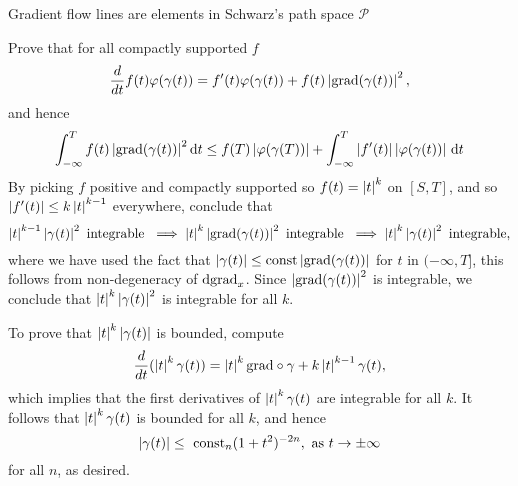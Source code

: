 \documentclass{amsart}
\begin{document}
\begin{clear}{Gradient flow lines are elements in Schwarz's path space
    $\mathscr{P}$}
\begin{xca}
    Prove that for all compactly supported $f$
    \begin{equation*}
      \frac{d}{dt}f(t)\varphi(\gamma(t))=f'(t)\varphi(\gamma(t))+f(t)\left|\mathrm{grad}(\gamma(t))\right|^{2},
    \end{equation*}
    and hence
    \begin{equation*}
      \int_{-\infty}^{T} f(t) \left|\mathrm{grad}(\gamma(t))\right|^{2}\mathrm{d} t\le f(T)\left|\varphi(\gamma(T))\right|+\int_{-\infty}^{T}\left|f'(t)\right|\left|\varphi(\gamma(t))\right|\,\mathrm{d} t
    \end{equation*}
    By picking $f$ positive and compactly supported so $f(t)=\left|t\right|^{k}$ on $[S,T]$, and so $\left|f'(t)\right|\le k\left|t\right|^{k-1}$ everywhere, conclude that
    \begin{equation*}
      \left|t\right|^{k-1}\left|\gamma(t)\right|^{2}\text{ integrable }\implies \left|t\right|^{k}\left|\mathrm{grad}(\gamma(t))\right|^{2}\text{ integrable }\implies \left|t\right|^{k}\left|\gamma(t)\right|^{2}\text{ integrable},
    \end{equation*}
    where we have used the fact that $\left|\gamma(t)\right|\le \text{const}\left|\mathrm{grad}(\gamma(t))\right|$ for $t$ in $(-\infty,T]$, this follows from non-degeneracy of $\mathrm{d}\mathrm{grad}_{x}$. Since $\left|\mathrm{grad}(\gamma(t))\right|^{2}$ is integrable, we conclude that $\left|t\right|^{k}\left|\gamma(t)\right|^{2}$ is integrable for all $k$.

    To prove that $\left|t\right|^{k}\left|\gamma(t)\right|$ is bounded, compute
    \begin{equation*}
      \frac{d}{dt}(\left|t\right|^{k}\gamma(t))=\left|t\right|^{k}\text{grad}\circ \gamma+k\left|t\right|^{k-1}\gamma(t),
    \end{equation*}
    which implies that the first derivatives of $\left|t\right|^{k}\gamma(t)$ are integrable for all $k$. It follows that $\left|t\right|^{k}\gamma(t)$ is bounded for all $k$, and hence
    \begin{equation*}
       \abs{\gamma(t)}\le\ \text{const}_{n}(1+t^{2})^{-2n},\text{ as $t\to\pm \infty$}
     \end{equation*}
     for all $n$, as desired. 
  \end{xca}  

\end{clear}
\end{document}
